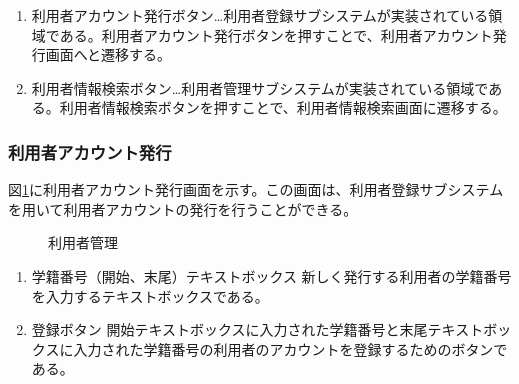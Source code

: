 \documentclass[a4j]{jarticle}
\begin{document}
\begin{enumerate}
  \renewcommand{\labelenumi}{\textcircled{\scriptsize \theenumi}}

\item 利用者アカウント発行ボタン…利用者登録サブシステムが実装されている領域である。利用者アカウント発行ボタンを押すことで、利用者アカウント発行画面へと遷移する。

\item 利用者情報検索ボタン…利用者管理サブシステムが実装されている領域である。利用者情報検索ボタンを押すことで、利用者情報検索画面に遷移する。

\end{enumerate}

\subsubsection{利用者アカウント発行}
図\ref{fig:create_user}に利用者アカウント発行画面を示す。この画面は、利用者登録サブシステムを用いて利用者アカウントの発行を行うことができる。
\begin{figure}[H]
\centering
{}
\caption{利用者管理}
\label{fig:create_user}
\end{figure}

\begin{enumerate}
  \renewcommand{\labelenumi}{\textcircled{\scriptsize \theenumi}}

\item 学籍番号（開始、末尾）テキストボックス
  新しく発行する利用者の学籍番号を入力するテキストボックスである。
\item 登録ボタン
  開始テキストボックスに入力された学籍番号と末尾テキストボックスに入力された学籍番号の利用者のアカウントを登録するためのボタンである。
\end{enumerate}
\end{document}
